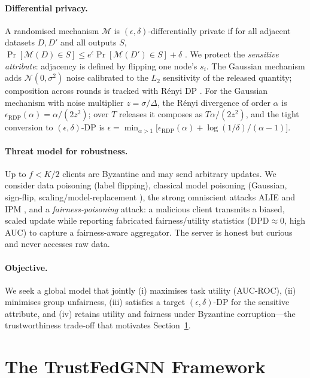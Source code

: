 \documentclass[pdflatex,sn-mathphys-num]{sn-jnl}
\theoremstyle{thmstyleone}%
\theoremstyle{thmstyletwo}%
\theoremstyle{thmstylethree}%
\newcommand{\dpd}{\mathrm{DPD}}
\begin{document}
\paragraph{Differential privacy.}
A randomised mechanism $\mathcal{M}$ is $(\epsilon,\delta)$-differentially
private if for all adjacent datasets $D,D'$ and all outputs $S$,
$\Pr[\mathcal{M}(D)\in S]\le e^{\epsilon}\Pr[\mathcal{M}(D')\in S]+\delta$
\cite{dwork2014algorithmic}. We protect the \emph{sensitive attribute}:
adjacency is defined by flipping one node's $s_i$. The Gaussian mechanism adds
$\mathcal{N}(0,\sigma^2)$ noise calibrated to the $L_2$ sensitivity of the
released quantity; composition across rounds is tracked with R\'enyi DP
\cite{mironov2017renyi}. For the Gaussian mechanism with noise multiplier
$z=\sigma/\Delta$, the R\'enyi divergence of order $\alpha$ is
$\epsilon_{\mathrm{RDP}}(\alpha)=\alpha/(2z^2)$; over $T$ releases it composes as
$T\alpha/(2z^2)$, and the tight conversion to $(\epsilon,\delta)$-DP is
$\epsilon=\min_{\alpha>1}\big[\epsilon_{\mathrm{RDP}}(\alpha)+\log(1/\delta)/(\alpha-1)\big]$.

\paragraph{Threat model for robustness.}
Up to $f<K/2$ clients are Byzantine and may send arbitrary updates. We consider
data poisoning (label flipping), classical model poisoning (Gaussian, sign-flip,
scaling/model-replacement \cite{bagdasaryan2020backdoor}), the strong
omniscient attacks ALIE \cite{baruch2019little} and IPM \cite{xie2019fall},
and a \emph{fairness-poisoning} attack: a malicious client transmits a biased,
scaled update while reporting fabricated fairness/utility statistics
($\dpd\!\approx\!0$, high AUC) to capture a fairness-aware aggregator. The
server is honest but curious and never accesses raw data.

\paragraph{Objective.}
We seek a global model that jointly (i) maximises task utility (AUC-ROC), (ii)
minimises group unfairness, (iii) satisfies a target $(\epsilon,\delta)$-DP for
the sensitive attribute, and (iv) retains utility and fairness under Byzantine
corruption---the trustworthiness trade-off that motivates
Section~\ref{sec:method}.

\section{The TrustFedGNN Framework}
\label{sec:method}
\end{document}
